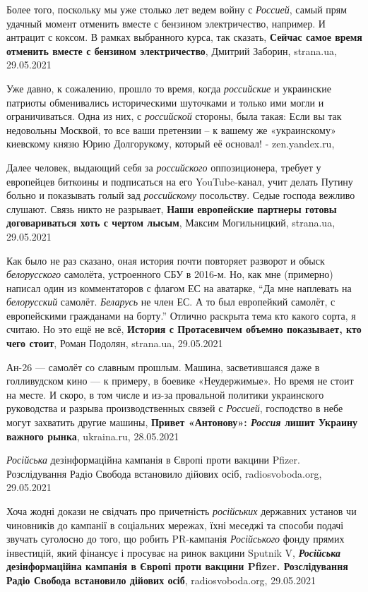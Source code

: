 Более того, поскольку мы уже столько лет ведем войну с \emph{Россией}, самый
прям удачный момент отменить вместе с бензином электричество, например. И
антрацит с коксом. В рамках выбранного курса, так сказать, \textbf{Сейчас самое
время отменить вместе с бензином электричество}, Дмитрий Заборин, strana.ua,
29.05.2021

Уже давно, к сожалению, прошло то время, когда \emph{российские} и украинские патриоты
обменивались историческими шуточками и только ими могли и ограничиваться. Одна
из них, с \emph{российской} стороны, была такая:
Если вы так недовольны Москвой, то все ваши претензии – к вашему же
«украинскому» киевскому князю Юрию Долгорукому, который её основал! - zen.yandex.ru, 

Далее человек, выдающий себя за \emph{российского} оппозиционера, требует у
европейцев биткоины и подписаться на его YouTube-канал, учит делать Путину
больно и показывать голый зад \emph{российскому} посольству. Седые господа
вежливо слушают.  Связь никто не разрывает, \textbf{Наши европейские партнеры
готовы договариваться хоть с чертом лысым}, Максим Могильницкий, strana.ua,
29.05.2021

Как было не раз сказано, оная история почти повторяет разворот и обыск
\emph{белорусского} самолёта, устроенного СБУ в 2016-м. Но, как мне (примерно)
написал один из комментаторов с флагом ЕС на аватарке, \enquote{Да мне
наплевать на \emph{белорусский} самолёт. \emph{Беларусь} не член ЕС. А то был
европейкий самолёт, с европейскими гражданами на борту.} Отлично раскрыта тема
кто какого сорта, я считаю.  Но это ещё не всё, \textbf{История с Протасевичем
объемно показывает, кто чего стоит}, Роман Подолян, strana.ua, 29.05.2021

Ан-26 — самолёт со славным прошлым. Машина, засветившаяся даже в голливудском
кино — к примеру, в боевике «Неудержимые».  Но время не стоит на месте. И
скоро, в том числе и из-за провальной политики украинского руководства и
разрыва производственных связей с \emph{Россией}, господство в небе могут
захватить другие машины, \textbf{Привет «Антонову»: \emph{Россия} лишит Украину
важного рынка}, ukraina.ru, 28.05.2021

\emph{Російська} дезінформаційна кампанія в Європі проти вакцини Pfizer.
Розслідування Радіо Свобода встановило дійових осіб, radiosvoboda.org,
29.05.2021

Хоча жодні докази не свідчать про причетність \emph{російських} державних
установ чи чиновників до кампанії в соціальних мережах, їхні меседжі та способи
подачі звучать суголосно до того, що робить PR-кампанія \emph{Російського}
фонду прямих інвестицій, який фінансує і просуває на ринок вакцини Sputnik V,
\textbf{\emph{Російська} дезінформаційна кампанія в Європі проти вакцини
Pfizer. Розслідування Радіо Свобода встановило дійових осіб}, radiosvoboda.org,
29.05.2021

